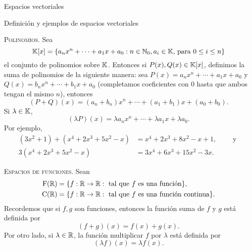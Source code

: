 \begin{chapter}{Espacios vectoriales}
\begin{section}{Definici\'on y ejemplos de espacios vectoriales}
            \begin{ejemplo*}{\textsc{Polinomios.}} Sea 
                \begin{equation*}
                \mathbb K[x] = \{a_nx^n + \cdots + a_1x + a_0: n \in \mathbb N_0, a_i \in \mathbb K\text{, para } 0\le i \le n  \}
                \end{equation*}
                el conjunto de polinomios sobre $\mathbb K$. Entonces si $P(x), Q(x) \in \mathbb K[x]$, definimos la suma de polinomios de la siguiente manera: sea $P(x) = a_nx^n + \cdots + a_1x + a_0$ y $Q(x)= b_nx^n + \cdots + b_1x + a_0$ (completamos coeficientes con 0 hasta que ambos tengan el mismo $n$), entonces
                \begin{equation*}
                (P+Q)(x) = (a_n+b_n)x^n + \cdots + (a_1+ b_1)x + (a_0+b_0).
                \end{equation*}
                Si $\lambda \in \mathbb K$, 
                \begin{equation*}
                (\lambda P)(x) = \lambda a_nx^n + \cdots + \lambda a_1x + \lambda a_0.
                \end{equation*}
                Por ejemplo,
                \begin{align*}
                (3x^2 + 1)+(x^4 + 2x^3 + 5x^2-x) &= x^4 + 2x^3 + 8x^2-x +1, \qquad \text{ y } \\
                3(x^4 + 2x^3 + 5x^2-x) &= 3x^4 + 6x^3 + 15x^2-3x.
                \end{align*}
            \end{ejemplo*}
            
            
            \medspace
            
            \begin{ejemplo*}{\textsc{Espacios de funciones.}} Sean
                \begin{align*}
                \operatorname{F}(\mathbb R) &= \{f: \mathbb R \to \mathbb R: \text{ tal que } f \text{ es una función} \},\\
                \operatorname{C}(\mathbb R) &= \{f: \mathbb R \to \mathbb R: \text{ tal que }  f  \text{ es una función continua} \}.
                \end{align*}
                Recordemos que si $f,g$ son funciones, entonces la función suma de $f$ y $g$ está definida por
                \begin{equation*}
                (f+g)(x) = f(x) + g(x).
                \end{equation*}
                Por otro lado, si $\lambda \in \mathbb R$, la función multiplicar $f$ por $\lambda $ está definida por
                \begin{equation*}
                (\lambda f)(x) = \lambda f(x).
                \end{equation*}			
                                

\end{ejemplo*}
\end{section}
\end{chapter}
